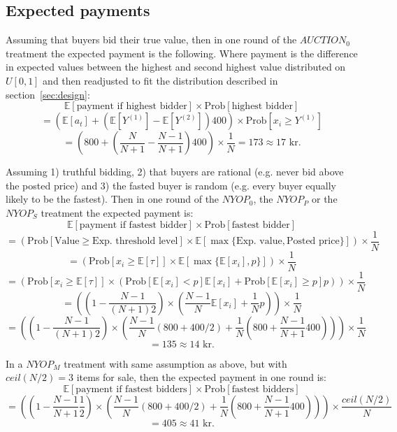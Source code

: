 \documentclass[a4paper,12pt]{article}
\begin{document}
	\subsection{Expected payments}
	\label{app:expected_payment}
	
	Assuming that buyers bid their true value, then in one round of the $AUCTION_0$ treatment the expected payment is the following. Where payment is the difference in expected values between the highest and second highest value distributed on $U[0,1]$ and then readjusted to fit the distribution described in section~\ref{sec:design}:
	\[ \mathbb{E}[\mbox{payment if highest bidder}] \times \mbox{Prob}[\mbox{highest bidder}] \] 
	\[  = \left( \mathbb{E}[a_t] + (\mathbb{E}[Y^{(1)}]-\mathbb{E}[Y^{(2)}]) 400 \right) \times \mbox{Prob}[x_i \ge Y^{(1)}] \] 
	\[	= \left( 800 + \left(\frac{N}{N+1} - \frac{N-1}{N+1}\right)400 \right) \times \frac{1}{N} = 173 \approx 17\mbox{ kr.} \]
	
	Assuming 1) truthful bidding, 2) that buyers are rational (e.g. never bid above the posted price) and 3) the fasted buyer is random (e.g. every buyer equally likely to be the fastest). Then in one round of the $NYOP_0$, the $NYOP_P$ or the $NYOP_S$ treatment the expected payment is:
	\[ \mathbb{E}[\mbox{payment if fastest bidder}] \times \mbox{Prob}[\mbox{fastest bidder}] \] 
	\[  = \left( \mbox{Prob}[\mbox{Value} \ge \mbox{Exp. threshold level}] \times \mathbb{E}[\max\{\mbox{Exp. value}, \mbox{Posted price}\}] \right) \times \frac{1}{N} \] 
	\[  = \left( \mbox{Prob}[x_i \ge \mathbb{E}[\tau]] \times \mathbb{E}[\max\{\mathbb{E}[x_i], p\}]  \right) \times \frac{1}{N} \] 
	\[  = \left( \mbox{Prob}[x_i \ge \mathbb{E}[\tau]] \times ( \mbox{Prob}[\mathbb{E}[x_i] < p] \mathbb{E}[x_i] + \mbox{Prob}[\mathbb{E}[x_i] \ge p] p ) \right) \times \frac{1}{N} \] 
	\[  = \left( \left(1-\frac{N-1}{(N+1)2}\right) \times \left( \frac{N-1}{N} \mathbb{E}[x_i] + \frac{1}{N} p \right) \right) \times \frac{1}{N} \] 
	\[  = \left( \left(1-\frac{N-1}{(N+1)2}\right) \times \left( \frac{N-1}{N} (800+400/2) + \frac{1}{N} \left(800+\frac{N-1}{N+1}400\right) \right) \right) \times \frac{1}{N} \] 
	\[	= 135 \approx 14\mbox{ kr.} \]
	
	In a $NYOP_M$ treatment with same assumption as above, but with $ceil(N/2)=3$ items for sale, then the expected payment in one round is:
	\[ \mathbb{E}[\mbox{payment if fastest bidders}] \times \mbox{Prob}[\mbox{fastest bidders}] \] 
	\[  = \left( \left(1-\frac{N-1}{N+1}\frac{1}{2}\right) \times \left( \frac{N-1}{N} (800+400/2) + \frac{1}{N} \left(800+\frac{N-1}{N+1}400\right) \right) \right) \times \frac{ceil(N/2)}{N} \] 
	\[	= 405 \approx 41\mbox{ kr.} \]
\end{document}
